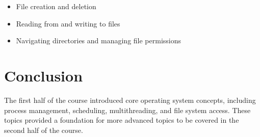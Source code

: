 \documentclass[12pt]{article}
\begin{document}
\begin{itemize}
    \item File creation and deletion
    \item Reading from and writing to files
    \item Navigating directories and managing file permissions
\end{itemize}

\section{Conclusion}
The first half of the course introduced core operating system concepts, including process management, scheduling, multithreading, and file system access. These topics provided a foundation for more advanced topics to be covered in the second half of the course.
\end{document}
